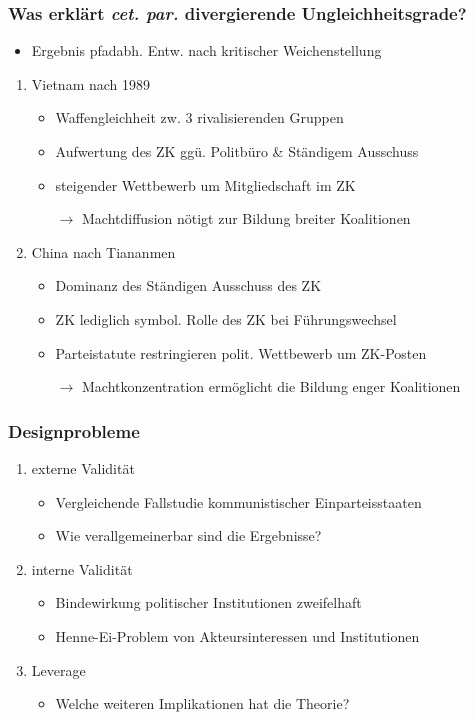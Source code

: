 \documentclass{beamer}
\begin{document}
\begin{frame}
  \frametitle{Was erklärt \textit{cet. par.} divergierende Ungleichheitsgrade?}
  \begin{itemize}
    \item Ergebnis pfadabh. Entw. nach kritischer Weichenstellung
  \end{itemize}
  \begin{enumerate}
    \item Vietnam nach 1989
    \begin{itemize}
      \item Waffengleichheit zw. 3 rivalisierenden Gruppen
      \item Aufwertung des ZK ggü. Politbüro \& Ständigem Ausschuss
      \item steigender Wettbewerb um Mitgliedschaft im ZK
      \item [$\rightarrow$] Machtdiffusion nötigt zur Bildung breiter Koalitionen
    \end{itemize}
    \item China nach Tiananmen
    \begin{itemize}
      \item Dominanz des Ständigen Ausschuss des ZK
      \item ZK lediglich symbol. Rolle des ZK bei Führungswechsel
      \item Parteistatute restringieren polit. Wettbewerb um ZK-Posten
      \item [$\rightarrow$] Machtkonzentration ermöglicht die Bildung enger Koalitionen
    \end{itemize}
  \end{enumerate}
\end{frame}

\begin{frame}
  \frametitle{Designprobleme}
  \begin{enumerate}
    \item externe Validität
    \begin{itemize}
      \item Vergleichende Fallstudie kommunistischer Einparteisstaaten
      \item Wie verallgemeinerbar sind die Ergebnisse?
    \end{itemize}
    \item interne Validität
    \begin{itemize}
      \item Bindewirkung politischer Institutionen zweifelhaft
      \item Henne-Ei-Problem von Akteursinteressen und Institutionen
    \end{itemize}
      \item Leverage
    \begin{itemize}
      \item Welche weiteren Implikationen hat die Theorie?
    \end{itemize}
  \end{enumerate}
\end{frame}
\end{document}
